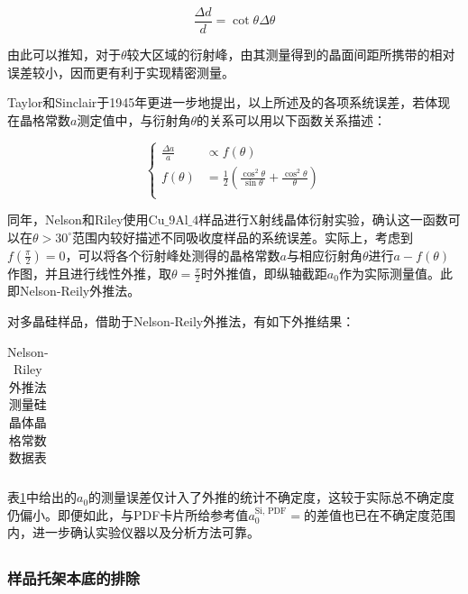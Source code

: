 \documentclass{thuemp}
\begin{document}
\begin{equation}
    \frac{\Delta d}{d} = \cot{\theta}\Delta\theta 
    \label{eqn:d_err}
\end{equation}

由此可以推知，对于$\theta$较大区域的衍射峰，由其测量得到的晶面间距所携带的相对误差较小，因而更有利于实现精密测量。

Taylor和Sinclair于1945年更进一步地提出，以上所述及的各项系统误差，若体现在晶格常数$a$测定值中，与衍射角$\theta$的关系可以用以下函数关系描述：

\begin{equation}
    \begin{cases}
        \frac{\Delta a}{a} & \propto f(\theta) \\
        f(\theta) & = \frac{1}{2} \left(\frac{\cos^2\theta}{\sin\theta} + \frac{\cos^2\theta}{\theta}\right) \\
    \end{cases}
\end{equation}

同年，Nelson和Riley使用$\text{Cu_9Al_4}$样品进行X射线晶体衍射实验，确认这一函数可以在$\theta > 30^\circ$范围内较好描述不同吸收度样品的系统误差。实际上，考虑到$f\left(\frac{\pi}{2}\right) = 0$，可以将各个衍射峰处测得的晶格常数$a$与相应衍射角$\theta$进行$a-f(\theta)$作图，并且进行线性外推，取$\theta=\frac{\pi}{2}$时外推值，即纵轴截距$a_0$作为实际测量值。此即Nelson-Reily外推法。

对多晶硅样品，借助于Nelson-Reily外推法，有如下外推结果：

\begin{table}[H]
    \centering
    \captionnamefont{\wuhao\bf\heiti}
    \captiontitlefont{\wuhao\bf\heiti}
    \caption{Nelson-Riley外推法测量硅晶体晶格常数数据表}
    \label{tab:si_xrd_extrapol}
    \liuhao
    \begin{tabular}{ccccc}
        \toprule
        \midrule
        \bottomrule
    \end{tabular}
\end{table}

表\ref{tab:si_xrd_extrapol}中给出的$a_0$的测量误差仅计入了外推的统计不确定度，这较于实际总不确定度仍偏小。即便如此，与PDF卡片所给参考值$a_0^{\text{Si, PDF}} = $的差值也已在不确定度范围内，进一步确认实验仪器以及分析方法可靠。

\subsection{}

\subsubsection{样品托架本底的排除}
\end{document}
